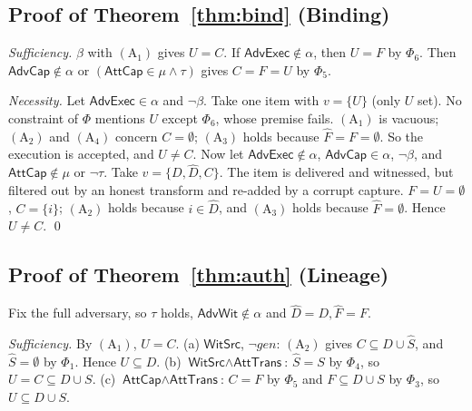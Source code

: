 \subsection*{Proof of Theorem~\ref{thm:bind} (Binding)}

\emph{Sufficiency.} $\beta$ with $(\mathrm A_1)$ gives $U=C$. If
$\textsf{AdvExec}\notin\alpha$, then $U=F$ by $\Phi_6$. Then $\textsf{AdvCap}\notin\alpha$
or $(\textsf{AttCap}\in\mu\wedge\tau)$ gives $C=F=U$ by $\Phi_5$.

\emph{Necessity.} Let $\textsf{AdvExec}\in\alpha$ and $\neg\beta$. Take one item with
$v=\{U\}$ (only $U$ set). No constraint of $\Phi$ mentions $U$ except $\Phi_6$, whose
premise fails. $(\mathrm A_1)$ is vacuous; $(\mathrm A_2)$ and $(\mathrm A_4)$ concern
$C=\emptyset$; $(\mathrm A_3)$ holds because $\hat F=F=\emptyset$. So the execution is
accepted, and $U\neq C$. Now let $\textsf{AdvExec}\notin\alpha$, $\textsf{AdvCap}\in\alpha$,
$\neg\beta$, and $\textsf{AttCap}\notin\mu$ or $\neg\tau$. Take $v=\{D,\hat D,C\}$. The item
is delivered and witnessed, but filtered out by an honest transform and re-added by a
corrupt capture. $F=U=\emptyset$, $C=\{i\}$; $(\mathrm A_2)$ holds because $i\in\hat D$, and
$(\mathrm A_3)$ holds because $\hat F=\emptyset$. Hence $U\neq C$. \qed

\subsection*{Proof of Theorem~\ref{thm:auth} (Lineage)}

Fix the full adversary, so $\tau$ holds, $\textsf{AdvWit}\notin\alpha$ and
$\hat D=D,\hat F=F$.

\emph{Sufficiency.} By $(\mathrm A_1)$, $U=C$.
(a) $\textsf{WitSrc}$, $\neg\mathit{gen}$: $(\mathrm A_2)$ gives $C\subseteq D\cup\hat S$,
and $\hat S=\emptyset$ by $\Phi_1$. Hence $U\subseteq D$.
(b) $\textsf{WitSrc}\wedge\textsf{AttTrans}$: $\hat S=S$ by $\Phi_4$, so
$U=C\subseteq D\cup S$.
(c) $\textsf{AttCap}\wedge\textsf{AttTrans}$: $C=F$ by $\Phi_5$ and $F\subseteq D\cup S$ by
$\Phi_3$, so $U\subseteq D\cup S$.

